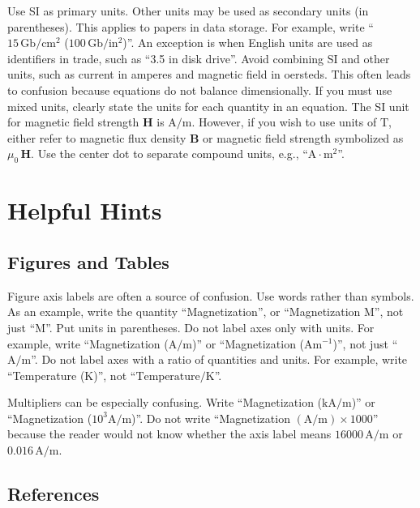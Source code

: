 \documentclass{ifacconf}
\begin{document}
Use SI as primary units. Other units may be used as secondary units
(in parentheses). This applies to papers in data storage. For example,
write ``$15\,\mathrm{Gb}/\mathrm{cm}^2$ ($100\,\mathrm{Gb}/\mathrm{in}^2$)''. 
An exception is when
English units are used as identifiers in trade, such as ``3.5 in
disk drive''. Avoid combining SI and other units, such as current in
amperes and magnetic field in oersteds. This often leads to confusion
because equations do not balance dimensionally. If you must use mixed
units, clearly state the units for each quantity in an equation.  The
SI unit for magnetic field strength $\mathbf{H}$ is $\mathrm{A}/\mathrm{m}$. However, if you wish to
use units of $\mathrm{T}$, either refer to magnetic flux density $\mathbf{B}$ or
magnetic field strength symbolized as $\mu_0\,\mathbf{H}$. Use the center dot to
separate compound units, e.g., ``$\mathrm{A} \cdot \mathrm{m}^2$''.

\section{Helpful Hints}

\subsection{Figures and Tables}

Figure axis labels are often a source of confusion. Use words rather
than symbols. As an example, write the quantity ``Magnetization'', or
``Magnetization M'', not just ``M''. Put units in parentheses. Do not
label axes only with units.  For example, write ``Magnetization
($\mathrm{A}/\mathrm{m}$)'' or ``Magnetization ($\mathrm{A} \mathrm{m}^{-1}$)'', not just
 ``$\mathrm{A}/\mathrm{m}$''. Do not
label axes with a ratio of quantities and units. For example, write
``Temperature ($\mathrm{K}$)'', not ``$\mbox{Temperature}/\mathrm{K}$''.

Multipliers can be especially confusing. Write ``Magnetization
($\mathrm{kA}/\mathrm{m}$)'' or ``Magnetization ($10^3 \mathrm{A}/\mathrm{m}$)''. Do not write
``Magnetization $(\mathrm{A}/\mathrm{m}) \times 1000$'' because the reader would not know
whether the axis label means $16000\,\mathrm{A}/\mathrm{m}$ or $0.016\,\mathrm{A}/\mathrm{m}$.

\subsection{References}
\end{document}
